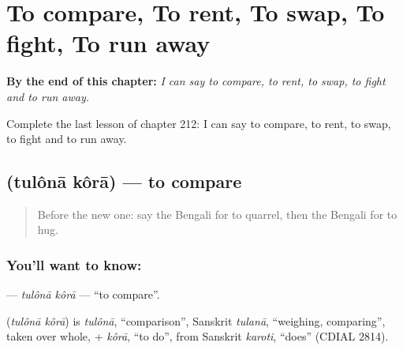 
\chapter{To compare, To rent, To swap, To fight, To run away}
\label{ch:bn-to-compare-to-rent-to-swap-to-fight-to-run-away}

\begin{chapteropening}
\textbf{By the end of this chapter:} \emph{I can say to compare, to rent, to swap, to fight and to run away.}

Complete the last lesson of chapter 212: I can say to compare, to rent, to swap, to fight and to run away.
\end{chapteropening}

\section[\texorpdfstring{\bn{তুলনা} \bn{করা} (tulônā kôrā)}{তুলনা করা (tulônā kôrā)}]{  (tulônā kôrā) — to compare}

\label{lesson:BN-C212-tulona-kora}



\begin{quote}
Before the new one: say the Bengali for to quarrel, then the Bengali for to hug.
\end{quote}

\subsection*{You'll want to know:  }
\textbf{ } — \emph{tulônā kôrā} — \textquotedblleft{}to compare\textquotedblright{}.

\begin{cousinweb}
\textbf{ } (\emph{tulônā kôrā}) is \emph{tulônā}, \textquotedblleft{}comparison\textquotedblright{}, Sanskrit \emph{tulanā}, \textquotedblleft{}weighing, comparing\textquotedblright{}, taken over whole, + \emph{kôrā}, \textquotedblleft{}to do\textquotedblright{}, from Sanskrit \emph{karoti}, \textquotedblleft{}does\textquotedblright{} (CDIAL 2814).
\end{cousinweb}

